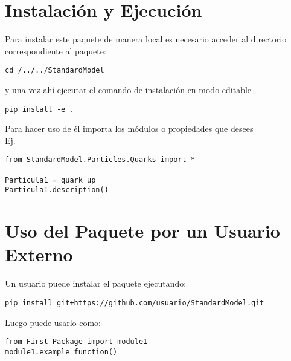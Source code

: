 \documentclass{article}
\begin{document}
\section{Instalación y Ejecución}
Para instalar este paquete de manera local es necesario acceder al directorio correspondiente al paquete:
\begin{verbatim}
cd /../../StandardModel
\end{verbatim}
y una vez ahí ejecutar el comando de instalación en modo editable 
\begin{verbatim}
pip install -e .
\end{verbatim}
Para hacer uso de él importa los módulos o propiedades que desees \\

Ej.
\begin{verbatim}
from StandardModel.Particles.Quarks import *

Particula1 = quark_up
Particula1.description()
\end{verbatim}

\section{Uso del Paquete por un Usuario Externo}
Un usuario puede instalar el paquete ejecutando:

\begin{verbatim}
pip install git+https://github.com/usuario/StandardModel.git
\end{verbatim}

Luego puede usarlo como:

\begin{verbatim}
from First-Package import module1
module1.example_function()
\end{verbatim}
\end{document}
